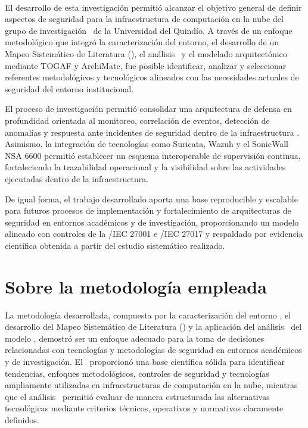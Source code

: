 \label{cap:conclusiones}
\mbox{}\\

El desarrollo de esta investigación permitió alcanzar el objetivo general de definir aspectos de seguridad para la infraestructura de 
computación en la nube del grupo de investigación \GRID\ de la Universidad del Quindío. A través de un enfoque metodológico que integró la 
caracterización del entorno, el desarrollo de un Mapeo Sistemático de Literatura (\SMS), el análisis \DAR\ y el modelado arquitectónico 
mediante TOGAF y ArchiMate, fue posible identificar, analizar y seleccionar referentes metodológicos y tecnológicos alineados con las 
necesidades actuales de seguridad del entorno institucional.

El proceso de investigación permitió consolidar una arquitectura de defensa en profundidad orientada al monitoreo, correlación de eventos, 
detección de anomalías y respuesta ante incidentes de seguridad dentro de la infraestructura \GRID. Asimismo, la integración de tecnologías 
como Suricata, Wazuh y el SonicWall NSA 6600 permitió establecer un esquema interoperable de supervisión continua, fortaleciendo la 
trazabilidad operacional y la visibilidad sobre las actividades ejecutadas dentro de la infraestructura.

De igual forma, el trabajo desarrollado aporta una base reproducible y escalable para futuros procesos de implementación y fortalecimiento 
de arquitecturas de seguridad en entornos académicos y de investigación, proporcionando un modelo alineado con controles de la \ISO/IEC 
27001 e \ISO/IEC 27017 y respaldado por evidencia científica obtenida a partir del estudio sistemático realizado.

\section{Sobre la metodología empleada}
\noindent

La metodología desarrollada, compuesta por la caracterización del entorno \GRID, el desarrollo del Mapeo Sistemático de Literatura (\SMS) y 
la aplicación del análisis \DAR\ del modelo \CMMI, demostró ser un enfoque adecuado para la toma de decisiones relacionadas con tecnologías 
y metodologías de seguridad en entornos académicos y de investigación. El \SMS\ proporcionó una base científica sólida para identificar 
tendencias, enfoques metodológicos, controles de seguridad y tecnologías ampliamente utilizadas en infraestructuras de computación en la 
nube, mientras que el análisis \DAR\ permitió evaluar de manera estructurada las alternativas tecnológicas mediante criterios técnicos, 
operativos y normativos claramente definidos.

